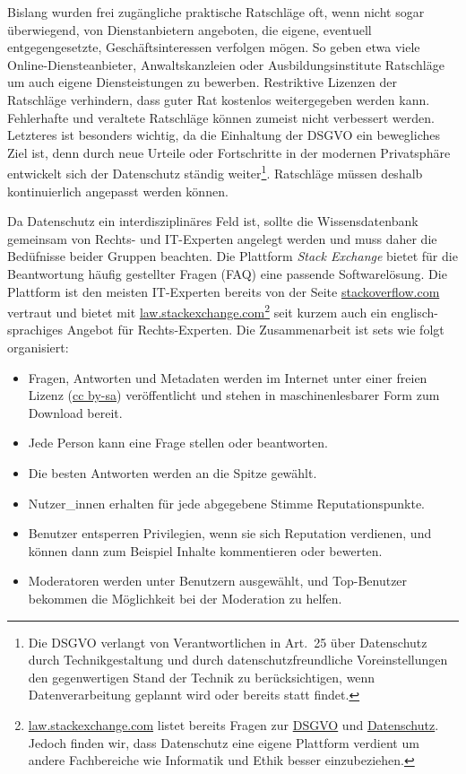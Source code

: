 \documentclass{scrlttr2}
\let\tightlist\relax
\begin{document}
\begin{letter}{}
Bislang wurden frei zugängliche praktische Ratschläge oft, wenn nicht
sogar überwiegend, von Dienstanbietern angeboten, die eigene, eventuell
entgegengesetzte, Geschäftsinteressen verfolgen mögen. So geben etwa
viele Online-Diensteanbieter, Anwaltskanzleien oder Ausbildungsinstitute
Ratschläge um auch eigene Diensteistungen zu bewerben. Restriktive
Lizenzen der Ratschläge verhindern, dass guter Rat kostenlos
weitergegeben werden kann. Fehlerhafte und veraltete Ratschläge können
zumeist nicht verbessert werden. Letzteres ist besonders wichtig, da die
Einhaltung der DSGVO ein bewegliches Ziel ist, denn durch neue Urteile
oder Fortschritte in der modernen Privatsphäre entwickelt sich der
Datenschutz ständig weiter\footnote{Die DSGVO verlangt von
  Verantwortlichen in Art.~25 über Datenschutz durch Technikgestaltung
  und durch datenschutzfreundliche Voreinstellungen den gegenwertigen
  Stand der Technik zu berücksichtigen, wenn Datenverarbeitung geplannt
  wird oder bereits statt findet.}. Ratschläge müssen deshalb
kontinuierlich angepasst werden können.

Da Datenschutz ein interdisziplinäres Feld ist, sollte die
Wissensdatenbank gemeinsam von Rechts- und IT-Experten angelegt werden
und muss daher die Bedüfnisse beider Gruppen beachten. Die Plattform
\emph{Stack Exchange} bietet für die Beantwortung häufig gestellter
Fragen (FAQ) eine passende Softwarelösung. Die Plattform ist den meisten
IT-Experten bereits von der Seite
\href{https://stackoverflow.com}{stackoverflow.com} vertraut und bietet
mit
\href{https://law.stackexchange.com}{law.stackexchange.com}\footnote{\href{https://law.stackexchange.com}{law.stackexchange.com}
  listet bereits Fragen zur
  \href{https://law.stackexchange.com/questions/tagged/gdpr}{DSGVO} und
  \href{https://law.stackexchange.com/questions/tagged/gdpr+data-protection}{Datenschutz}.
  Jedoch finden wir, dass Datenschutz eine eigene Plattform verdient um
  andere Fachbereiche wie Informatik und Ethik besser einzubeziehen.}
seit kurzem auch ein englisch-sprachiges Angebot für Rechts-Experten.
Die Zusammenarbeit ist sets wie folgt organisiert:

\begin{itemize}
\tightlist
\item
  Fragen, Antworten und Metadaten werden im Internet unter einer freien
  Lizenz (\href{https://creativecommons.org/licenses/by-sa/3.0/}{cc
  by-sa}) veröffentlicht und stehen in maschinenlesbarer Form zum
  Download bereit.
\item
  Jede Person kann eine Frage stellen oder beantworten.
\item
  Die besten Antworten werden an die Spitze gewählt.
\item
  Nutzer\_innen erhalten für jede abgegebene Stimme Reputationspunkte.
\item
  Benutzer entsperren Privilegien, wenn sie sich Reputation verdienen,
  und können dann zum Beispiel Inhalte kommentieren oder bewerten.
\item
  Moderatoren werden unter Benutzern ausgewählt, und Top-Benutzer
  bekommen die Möglichkeit bei der Moderation zu helfen.
\end{itemize}


\end{letter}
\end{document}
